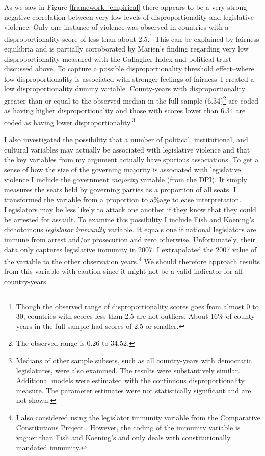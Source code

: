 \documentclass[a4paper]{article}\usepackage[]{graphicx}\usepackage[]{color}
\begin{document}
As we saw in Figure \ref{framework_empirical} there appears to be a very strong negative correlation between very low levels of disproportionality and legislative violence. Only one instance of violence was observed in countries with a disproportionality score of less than about 2.5.\footnote{Though the observed range of disproportionality scores goes from almost 0 to 30, countries with scores less than 2.5 are not outliers. About 16\% of county-years in the full sample had scores of 2.5 or smaller.} This can be explained by fairness equilibria and is partially corroborated by Marien's \citeyearpar{Marien2011} finding regarding very low disproportionality measured with the Gallagher Index and political trust discussed above. To capture a possible disproportionality threshold effect--where low disproportionality is associated with stronger feelings of fairness--I created a low disproportionality dummy variable. County-years with disproportionality greater than or equal to the observed median in the full sample (6.34)\footnote{The observed range is 0.26 to 34.52.} are coded as having higher disproportionality and those with scores lower than 6.34 are coded as having lower disproportionality.\footnote{Medians of other sample subsets, such as all country-years with democratic legislatures, were also examined. The results were substantively similar. Additional models were estimated with the continuous disproportionality measure. The parameter estimates were not statistically significant and are not shown.}

I also investigated the possibility that a number of political, institutional, and cultural variables may actually be associated with legislative violence and that the key variables from my argument actually have spurious associations. To get a sense of how the size of the governing majority is associated with legislative violence I include the government {\emph{majority}} variable (from the DPI). It simply measures the seats held by governing parties as a proportion of all seats. I transformed the variable from a proportion to a\%age to ease interpretation. Legislators may be less likely to attack one another if they know that they could be arrested for assault. To examine this possibility I include Fish and Koening's \citeyearpar{Fish2009} dichotomous \emph{legislator immunity} variable. It equals one if national legislators are immune from arrest and/or prosecution and zero otherwise. Unfortunately, their data only captures legislative immunity in 2007. I extrapolated the 2007 value of the variable to the other observation years.\footnote{I also considered using the legislator immunity variable from the Comparative Constitutions Project \citep{ElkinsCCP2010}. However, the coding of the immunity variable is vaguer than Fish and Koening's and only deals with constitutionally mandated immunity.} We should therefore approach results from this variable with caution since it might not be a valid indicator for all country-years.
\end{document}
